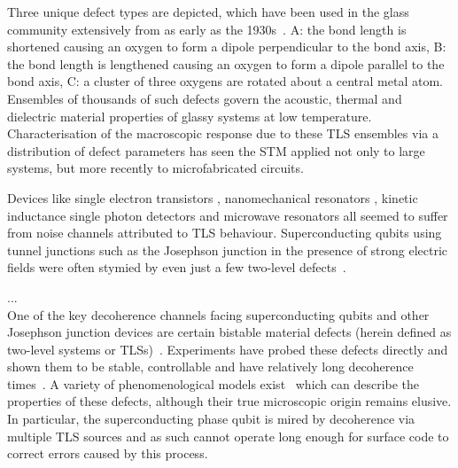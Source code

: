 Three unique defect types are depicted, which have been used in the glass community extensively from as early as the 1930s~\cite{Zachariasen1932}.
A: the bond length is shortened causing an oxygen to form a dipole perpendicular to the bond axis, B: the bond length is lengthened causing an oxygen to form a dipole parallel to the bond axis, C: a cluster of three oxygens are rotated about a central metal atom.
Ensembles of thousands of such defects govern the acoustic, thermal and dielectric material properties of glassy systems at low temperature.
Characterisation of the macroscopic response due to these TLS ensembles via a distribution of defect parameters \cite{Enss2005} has seen the STM applied not only to large systems, but more recently to microfabricated circuits.

Devices like single electron transistors \cite{Zimmerli1992}, nanomechanical resonators \cite{Ahn2003}, kinetic inductance single photon detectors and microwave resonators \cite{Gao2007} all seemed to suffer from noise channels attributed to TLS behaviour.
Superconducting qubits using tunnel junctions such as the Josephson junction in the presence of strong electric fields were often stymied by even just a few two-level defects~\cite{Simmonds2004}.




...\\



One of the key decoherence channels facing superconducting qubits and other Josephson junction devices are certain bistable material defects (herein defined as two-level systems or TLSs)~\cite{Dutta1981, Shnirman2005}.
Experiments have probed these defects directly and shown them to be stable, controllable and have relatively long decoherence times~\cite{Simmonds2004, Neeley2008, Shalibo2010, Lupascu2009, Lisenfeld2010, Gunnarsson2013}.
A variety of phenomenological models exist~\cite{Martinis2005, DeSousa2009, Sendelbach2008, Faoro2007,Ku2005} which can describe the properties of these defects, although their true microscopic origin remains elusive.
In particular, the superconducting phase qubit is mired by decoherence via multiple TLS sources and as such cannot operate long enough for surface code to correct errors caused by this process.



